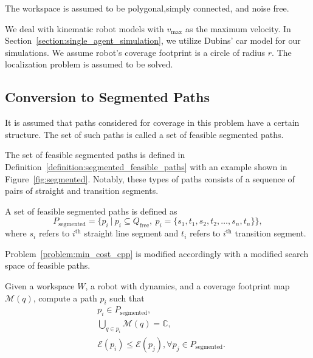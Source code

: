 \documentclass[../main.tex]{subfiles}
\begin{document}
\begin{assumption}
	The workspace is assumed to be polygonal,simply connected, and noise free. 
\end{assumption}

\begin{assumption}
	We deal with kinematic robot models with $v_{\max}$ as the maximum velocity. In Section~\ref{section:single_agent_simulation}, we utilize Dubins' car model for our simulations. We assume robot's coverage footprint is a circle of radius $r$. The localization problem is assumed to be solved. 
\end{assumption}


\subsection{Conversion to Segmented Paths}
\label{subsection:conversion_to_segmented}

\begin{assumption}
It is assumed that paths considered for coverage in this problem have a certain structure. The set of such paths is called a set of feasible segmented paths.
\end{assumption}

The set of feasible segmented paths is defined in Definition~\ref{definition:segmented_feasible_paths} with an example shown in Figure~\ref{fig:segmented}. Notably, these types of paths consists of a sequence of pairs of straight and transition segments.
\begin{definition}
\label{definition:segmented_feasible_paths}
A set of feasible segmented paths is defined as
	\begin{equation}
		P_{\text{segmented}}=\{p_i\ |\ p_i\subseteq Q_{\text{free}},\  p_i=\{s_1,t_1,s_2,t_2,\dots,s_n,t_n\}\},
	\end{equation}
	where $s_i$ refers to $i^{\text{th}}$ straight line segment and $t_i$ refers to $i^{\text{th}}$ transition segment.
\end{definition}

Problem~\ref{problem:min_cost_cpp} is modified accordingly with a modified search space of feasible paths.
\begin{problem}
\label{problem:min_cost_cpp_with_lines}
	Given a workspace $W$, a robot with dynamics, and a coverage footprint map $\mathcal{M}(q)$, compute a path $p_i$ such that
	\begin{equation}
	\label{condition:full_coverage_2}
	\begin{aligned}
		& p_i\in P_{\text{segmented}},\\
		& \bigcup_{q\in p_i}\mathcal{M}(q)=\mathbb{C},\\
		& \mathcal{E}(p_i)\leq\mathcal{E}(p_j), \forall p_j\in P_{\text{segmented}}.
	\end{aligned}
	\end{equation}
\end{problem}
\end{document}
